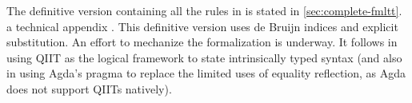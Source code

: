 The definitive version containing all the rules in \TT is stated in
\ifreport \cref{sec:complete-fmltt}.
\else a technical appendix \cite{fpop-tr}.
\fi
This definitive version uses de Bruijn indices and explicit substitution.
An effort to mechanize the formalization is underway. It follows \citet{altkap2016}
in using \ac{QIIT} as 
the logical framework to state intrinsically typed syntax (and also
in using Agda's  pragma to replace the limited uses of equality
reflection, as Agda does not support QIITs natively).


%


